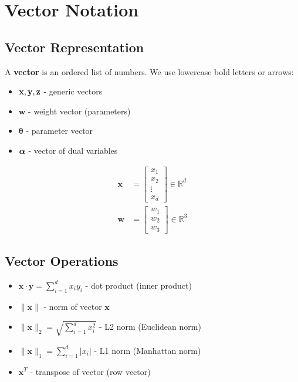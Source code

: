 \documentclass{article}
\providecommand{\vx}{\mathbf{x}}
\providecommand{\vy}{\mathbf{y}}
\providecommand{\vw}{\mathbf{w}}
\providecommand{\vtheta}{\boldsymbol{\theta}}
\providecommand{\Real}{\mathbb{R}}
\begin{document}
\section{Vector Notation}

\subsection{Vector Representation}
A \textbf{vector} is an ordered list of numbers. We use lowercase bold letters or arrows:
\begin{itemize}
    \item $\vx, \vy, \vz$ - generic vectors
    \item $\vw$ - weight vector (parameters)
    \item $\vtheta$ - parameter vector
    \item $\boldsymbol{\alpha}$ - vector of dual variables
\end{itemize}

\begin{tcolorbox}[colback=blue!5!white,colframe=blue!75!black,title=Vector Examples]
\begin{align}
\vx &= \begin{bmatrix} x_1 \\ x_2 \\ \vdots \\ x_d \end{bmatrix} \in \Real^d \\
\vw &= \begin{bmatrix} w_1 \\ w_2 \\ w_3 \end{bmatrix} \in \Real^3
\end{align}
\end{tcolorbox}

\subsection{Vector Operations}
\begin{itemize}
    \item $\vx \cdot \vy = \sum_{i=1}^d x_i y_i$ - dot product (inner product)
    \item $\|\vx\|$ - norm of vector $\vx$
    \item $\|\vx\|_2 = \sqrt{\sum_{i=1}^d x_i^2}$ - L2 norm (Euclidean norm)
    \item $\|\vx\|_1 = \sum_{i=1}^d |x_i|$ - L1 norm (Manhattan norm)
    \item $\vx^T$ - transpose of vector (row vector)
\end{itemize}
\end{document}
